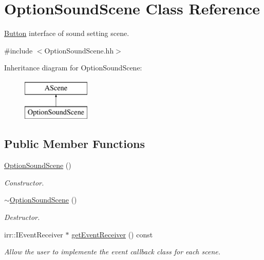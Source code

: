 \hypertarget{classOptionSoundScene}{}\section{Option\+Sound\+Scene Class Reference}
\label{classOptionSoundScene}


\hyperlink{classButton}{Button} interface of sound setting scene.  




{\ttfamily \#include $<$Option\+Sound\+Scene.\+hh$>$}

Inheritance diagram for Option\+Sound\+Scene\+:\begin{figure}[H]
\begin{center}
\leavevmode
\includegraphics[height=2.000000cm]{classOptionSoundScene}
\end{center}
\end{figure}
\subsection*{Public Member Functions}
\begin{DoxyCompactItemize}
\item 
\hyperlink{classOptionSoundScene_abb8409b9b9225118e2779a1e0e7a4b45}{Option\+Sound\+Scene} ()
\begin{DoxyCompactList}\small\item\em Constructor. \end{DoxyCompactList}\item 
\hyperlink{classOptionSoundScene_afaf96649164e48bb5820cca80bc5c024}{$\sim$\+Option\+Sound\+Scene} ()
\begin{DoxyCompactList}\small\item\em Destructor. \end{DoxyCompactList}\item 
irr\+::\+I\+Event\+Receiver $\ast$ \hyperlink{classOptionSoundScene_ac71da65763f0db4b05fc32444308b677}{get\+Event\+Receiver} () const
\begin{DoxyCompactList}\small\item\em Allow the user to implemente the event callback class for each scene. \end{DoxyCompactList}\end{DoxyCompactItemize}


